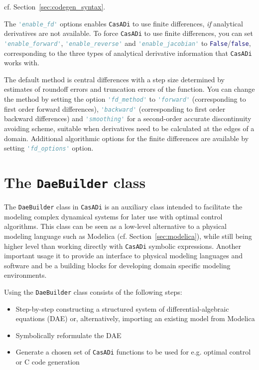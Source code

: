 \documentclass[a4paper,12pt]{book}
\newcommand{\CasADi}{\texttt{CasADi}\xspace}
\newcommand{\python}[1]{\lstinline[language=Python]{#1}}
\newcommand{\matlab}[1]{\lstinline[language=Matlab]{#1}}
\begin{document}
cf. Section~\ref{sec:codegen_syntax}.

The \python{'enable_fd'} options enables \CasADi to use finite differences, \emph{if}
analytical derivatives are not available. To force \CasADi to use finite differences,
you can set \python{'enable_forward'}, \python{'enable_reverse'} and \python{'enable_jacobian'} to \python{False}/\matlab{false}, corresponding to the three types of analytical derivative information that \CasADi works with.

The default method is central differences with a step size determined by estimates of roundoff errors and truncation errors of the function. You can change the method by setting the option \python{'fd_method'} to \python{'forward'} (corresponding to first order forward differences), \python{'backward'} (corresponding to first order backward differences) and \python{'smoothing'} for a second-order accurate discontinuity avoiding scheme, suitable when derivatives need to be calculated at the edges of a domain. Additional algorithmic options for the finite differences are available by setting \python{'fd_options'} option.

\chapter{The \texttt{DaeBuilder} class} \label{ch:daebuilder}
The \texttt{DaeBuilder} class in \CasADi is an auxiliary class intended to
facilitate the modeling complex dynamical systems for later use with optimal
control algorithms. This class can be seen as a low-level alternative to
a physical modeling language such as Modelica (cf. Section~\ref{sec:modelica}),
while still being higher level than working directly with \CasADi symbolic
expressions. Another important usage it to provide an interface to
physical modeling languages and software and be a building blocks for
developing domain specific modeling environments.

Using the \texttt{DaeBuilder} class consists of the following steps:
\begin{itemize}
  \item Step-by-step constructing a structured system of differential-algebraic
  equations (DAE) or, alternatively, importing an existing model from Modelica
  \item Symbolically reformulate the DAE
  \item Generate a chosen set of \CasADi functions to be used for e.g. optimal
  control or C code generation
\end{itemize}
\end{document}
